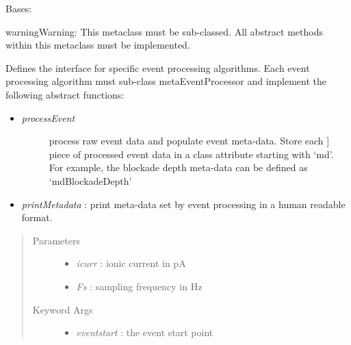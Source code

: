 \documentclass[letterpaper,10pt,english]{sphinxmanual}
\begin{document}
\begin{fulllineitems}
\label{api-doc/mosaic.meta:mosaic.metaEventProcessor.metaEventProcessor}
Bases: \href{http://docs.python.org/library/functions.html\#object}{}

\begin{notice}{warning}{Warning:}
This metaclass must be sub-classed. All abstract methods within this metaclass must be implemented.
\end{notice}

Defines the interface for specific event processing algorithms. Each event processing
algorithm must sub-class metaEventProcessor and implement the following abstract
functions:
\begin{itemize}
\item {} \begin{description}
\item[{\emph{processEvent}}] \leavevmode{[}process raw event data and populate event meta-data. Store each {]}
piece of processed event data in a class attribute starting with `md'.
For example, the blockade depth meta-data can be defined as `mdBlockadeDepth'

\end{description}

\item {} 
\emph{printMetadata} :     print meta-data set by event processing in a human readable format.

\end{itemize}
\begin{quote}\begin{description}
\item[{Parameters}] \leavevmode\begin{itemize}
\item {} 
\emph{icurr} :                             ionic current in pA

\item {} 
\emph{Fs} :                                sampling frequency in Hz

\end{itemize}

\item[{Keyword Args}] \leavevmode\begin{itemize}
\item {} 
\emph{eventstart} :                the event start point


\end{itemize}
\end{description}
\end{quote}
\end{fulllineitems}
\end{document}
